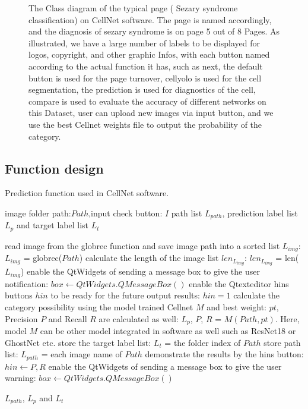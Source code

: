 \begin{figure}[t]
\begin{center}
\label{fig:cellnet}
\end{center}
\caption{ The Class diagram of the typical page ( Sezary syndrome classification) on CellNet software. The page is named accordingly, and the diagnosis of sezary syndrome is on page 5 out of 8 Pages. As illustrated, we have a large number of labels to be displayed for logos, copyright, and other graphic Infos, with each button named according to the actual function it has, such as next, the default button is used for the page turnover, cellyolo is used for the cell segmentation, the prediction is used for diagnostics of the cell, compare is used to evaluate the accuracy of different networks on this Dataset, user can upload new images via input button, and we use the best Cellnet weights file to output the probability of the category.}
\end{figure}



\subsection{Function design} %
\label{sub:amet}


\begin{algorithm}[t]
  \caption{Prediction function used in CellNet software.}
  \label{alg:Framwork}
  \begin{algorithmic}[1]
    \Require
    image folder path:$Path$,input check button: $I$
    \Ensure
     path list $L_{path}$, prediction label list $L_{p}$ and target label list $L_{t}$
  
      \State  read image from the globrec function and save image path into a sorted list $L_{img}$: $L_{img}$ = globrec($Path$)
      \State  calculate the length of the image list $len_{L_{img}}$: $len_{L_{img}}$ = len($L_{img}$)
      \State  enable the QtWidgets of sending a message box to give the user notification: $box  \gets QtWidgets.QMessageBox()$
      \State  enable the Qtexteditor  hins buttons $hin$ to be ready for the future output results: $ hin = 1$
      \State  calculate the category possibility using the model trained Cellnet $M$ and best weight: $pt$, Precision $P$ and Recall $R$ are calculated as well: $L_{p}$, $P$, $R$ = $M(Path,pt)$. Here, model $M$ can be other model integrated in software as well such as ResNet18 or GhostNet etc.
      \State  store the target label list: $L_{t}$ = the folder index of $Path$
      \State  store path list: $L_{path}$ = each image name of $Path$
      \State  demonstrate the results by the hins button: $hin  \gets P, R$
    \Else
      \State  enable the QtWidgets of sending a message box to give the user warning: $box  \gets QtWidgets.QMessageBox()$
      
    \EndIf \newline
   \Return  $L_{path}$, $L_{p}$ and $L_{t}$
  \end{algorithmic}
\end{algorithm}


